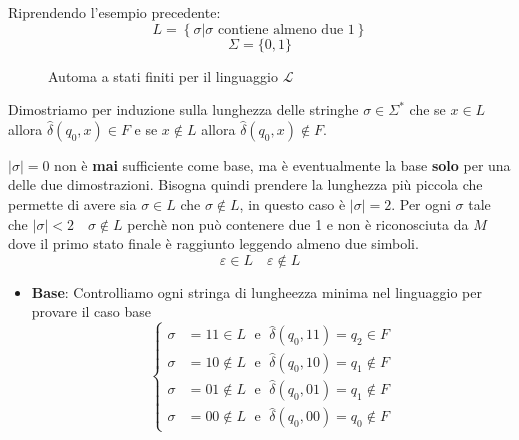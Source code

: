 \documentclass[a4paper]{article}
\begin{document}
\begin{example}
  Riprendendo l'esempio precedente:
  \[
    L = \left\{ \sigma  \left| \sigma \text{ contiene almeno due } 1 \right. \right\}
  \] 
  \[
    \Sigma = \{0,1\}
  \]
  \begin{figure}[H]
    \centering
    \caption{Automa a stati finiti per il linguaggio \( \mathcal{L} \)}
  \end{figure}
  Dimostriamo per induzione sulla lunghezza delle stringhe \( \sigma \in \Sigma^* \) 
  che se \( x \in L \) allora \( \hat{\delta}(q_0, x) \in F \) e se \( x \notin L \) allora
  \( \hat{\delta}(q_0, x) \notin F \).

  \vspace{1em}
  \noindent
  \( \left| \sigma  \right| = 0 \) non è \textbf{mai} sufficiente come base, ma
  è eventualmente la base \textbf{solo} per una delle due dimostrazioni. Bisogna
  quindi prendere la lunghezza più piccola che permette di avere sia \( \sigma \in L \) 
  che  \( \sigma \notin L \), in questo caso è \( \left| \sigma  \right| = 2 \).
  Per ogni \( \sigma  \) tale che \( \left| \sigma  \right| < 2 \quad \sigma \notin L \)
  perchè non può contenere due 1 e non è riconosciuta da \( M \) dove il primo stato finale
  è raggiunto leggendo almeno due simboli.
  \[
    \varepsilon \in L \quad \varepsilon \notin L
  \] 
  \begin{itemize}
    \item \textbf{Base}: Controlliamo ogni stringa di lungheezza minima nel linguaggio per
      provare il caso base
      \[
        \begin{cases}
          \sigma &= 11 \in L \; \text{ e } \; \hat{\delta}(q_0, 11) = q_2 \in F \\
          \sigma &= 10 \notin L \; \text{ e } \; \hat{\delta}(q_0, 10) = q_1 \notin F \\
          \sigma &= 01 \notin L \; \text{ e } \; \hat{\delta}(q_0, 01) = q_1 \notin F \\
          \sigma &= 00 \notin L \; \text{ e } \; \hat{\delta}(q_0, 00) = q_0 \notin F
        \end{cases}
      \] 


\end{itemize}
\end{example}
\end{document}
